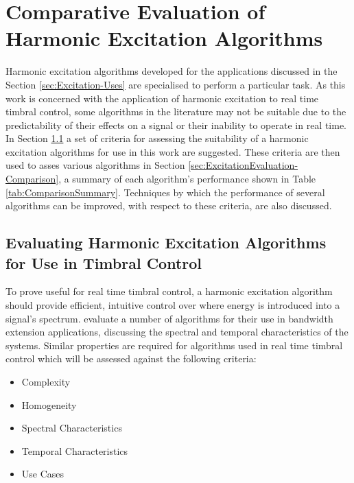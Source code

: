 
\chapter{Comparative Evaluation of Harmonic Excitation Algorithms}
\label{chap:ExcitationEvaluation}
	Harmonic excitation algorithms developed for the applications discussed in the Section \ref{sec:Excitation-Uses}
	are specialised to perform a particular task. As this work is concerned with the application of harmonic excitation
	to real time timbral control, some algorithms in the literature may not be suitable due to the predictability of
	their effects on a signal or their inability to operate in real time. In Section
	\ref{sec:ExcitationEvaluation-Evaluation} a set of criteria for assessing the suitability of a harmonic excitation
	algorithms for use in this work are suggested. These criteria are then used to asses various algorithms in Section
	\ref{sec:ExcitationEvaluation-Comparison}, a summary of each algorithm's performance shown in Table
	\ref{tab:ComparisonSummary}. Techniques by which the performance of several algorithms can be improved, with
	respect to these criteria, are also discussed.

\section{Evaluating Harmonic Excitation Algorithms for Use in Timbral Control}
\label{sec:ExcitationEvaluation-Evaluation}
	To prove useful for real time timbral control, a harmonic excitation algorithm should provide efficient, intuitive
	control over where energy is introduced into a signal's spectrum. \citet{larsen2004audio} evaluate a number of
	algorithms for their use in bandwidth extension applications, discussing the spectral and temporal characteristics
	of the systems. Similar properties are required for algorithms used in real time timbral control which will be
	assessed against the following criteria:

	\begin{itemize}
		\item Complexity
		\item Homogeneity
		\item Spectral Characteristics
		\item Temporal Characteristics
		\item Use Cases
	\end{itemize}


